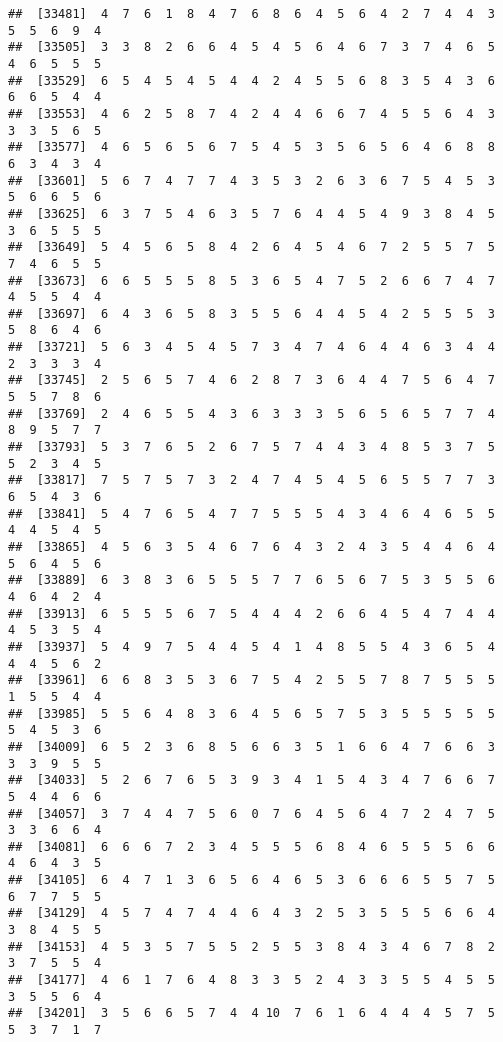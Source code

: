 \documentclass[
]{book}
\begin{document}
\begin{verbatim}
##  [33481]  4  7  6  1  8  4  7  6  8  6  4  5  6  4  2  7  4  4  3  5  5  6  9  4
##  [33505]  3  3  8  2  6  6  4  5  4  5  6  4  6  7  3  7  4  6  5  4  6  5  5  5
##  [33529]  6  5  4  5  4  5  4  4  2  4  5  5  6  8  3  5  4  3  6  6  6  5  4  4
##  [33553]  4  6  2  5  8  7  4  2  4  4  6  6  7  4  5  5  6  4  3  3  3  5  6  5
##  [33577]  4  6  5  6  5  6  7  5  4  5  3  5  6  5  6  4  6  8  8  6  3  4  3  4
##  [33601]  5  6  7  4  7  7  4  3  5  3  2  6  3  6  7  5  4  5  3  5  6  6  5  6
##  [33625]  6  3  7  5  4  6  3  5  7  6  4  4  5  4  9  3  8  4  5  3  6  5  5  5
##  [33649]  5  4  5  6  5  8  4  2  6  4  5  4  6  7  2  5  5  7  5  7  4  6  5  5
##  [33673]  6  6  5  5  5  8  5  3  6  5  4  7  5  2  6  6  7  4  7  4  5  5  4  4
##  [33697]  6  4  3  6  5  8  3  5  5  6  4  4  5  4  2  5  5  5  3  5  8  6  4  6
##  [33721]  5  6  3  4  5  4  5  7  3  4  7  4  6  4  4  6  3  4  4  2  3  3  3  4
##  [33745]  2  5  6  5  7  4  6  2  8  7  3  6  4  4  7  5  6  4  7  5  5  7  8  6
##  [33769]  2  4  6  5  5  4  3  6  3  3  3  5  6  5  6  5  7  7  4  8  9  5  7  7
##  [33793]  5  3  7  6  5  2  6  7  5  7  4  4  3  4  8  5  3  7  5  5  2  3  4  5
##  [33817]  7  5  7  5  7  3  2  4  7  4  5  4  5  6  5  5  7  7  3  6  5  4  3  6
##  [33841]  5  4  7  6  5  4  7  7  5  5  5  4  3  4  6  4  6  5  5  4  4  5  4  5
##  [33865]  4  5  6  3  5  4  6  7  6  4  3  2  4  3  5  4  4  6  4  5  6  4  5  6
##  [33889]  6  3  8  3  6  5  5  5  7  7  6  5  6  7  5  3  5  5  6  4  6  4  2  4
##  [33913]  6  5  5  5  6  7  5  4  4  4  2  6  6  4  5  4  7  4  4  4  5  3  5  4
##  [33937]  5  4  9  7  5  4  4  5  4  1  4  8  5  5  4  3  6  5  4  4  4  5  6  2
##  [33961]  6  6  8  3  5  3  6  7  5  4  2  5  5  7  8  7  5  5  5  1  5  5  4  4
##  [33985]  5  5  6  4  8  3  6  4  5  6  5  7  5  3  5  5  5  5  5  5  4  5  3  6
##  [34009]  6  5  2  3  6  8  5  6  6  3  5  1  6  6  4  7  6  6  3  3  3  9  5  5
##  [34033]  5  2  6  7  6  5  3  9  3  4  1  5  4  3  4  7  6  6  7  5  4  4  6  6
##  [34057]  3  7  4  4  7  5  6  0  7  6  4  5  6  4  7  2  4  7  5  3  3  6  6  4
##  [34081]  6  6  6  7  2  3  4  5  5  5  6  8  4  6  5  5  5  6  6  4  6  4  3  5
##  [34105]  6  4  7  1  3  6  5  6  4  6  5  3  6  6  6  5  5  7  5  6  7  7  5  5
##  [34129]  4  5  7  4  7  4  4  6  4  3  2  5  3  5  5  5  6  6  4  3  8  4  5  5
##  [34153]  4  5  3  5  7  5  5  2  5  5  3  8  4  3  4  6  7  8  2  3  7  5  5  4
##  [34177]  4  6  1  7  6  4  8  3  3  5  2  4  3  3  5  5  4  5  5  3  5  5  6  4
##  [34201]  3  5  6  6  5  7  4  4 10  7  6  1  6  4  4  4  5  7  5  5  3  7  1  7

\end{verbatim}
\end{document}
